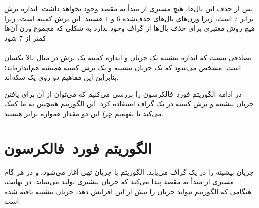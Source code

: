 \begin{center}
\end{center}

پس از حذف این یال‌ها،
هیچ مسیری از مبدأ به مقصد وجود نخواهد داشت.
اندازه برش برابر $7$ است،
زیرا وزن‌های یال‌های حذف‌شده
$6$ و $1$ هستند.
این برش کمینه است، زیرا هیچ روش
معتبری برای حذف یال‌ها از گراف وجود ندارد به شکلی که
مجموع وزن آن‌ها کمتر از $7$ شود.
\\\\
تصادفی نیست که
اندازه بیشینه یک جریان
و اندازه کمینه یک برش
در مثال بالا یکسان است.
مشخص می‌شود که یک جریان بیشینه
و یک برش کمینه
\emph{همیشه} هم‌اندازه‌اند؛
بنابراین این مفاهیم دو روی یک سکه‌اند.

در ادامه الگوریتم فورد–فالکرسون
را بررسی می‌کنیم که می‌توان از آن برای یافتن
جریان بیشینه و برش کمینه در یک گراف استفاده کرد.
این الگوریتم همچنین به ما کمک می‌کند تا بفهمیم
\emph{چرا} این دو مقدار همواره برابر هستند.

\section{الگوریتم فورد–فالکرسون}


 \cite{for56}
جریان بیشینه را در یک گراف می‌یابد.
الگوریتم با جریان تهی آغاز می‌شود،
و در هر گام مسیری از مبدأ
به مقصد پیدا می‌کند که جریان بیشتری تولید می‌نماید.
در نهایت، هنگامی که الگوریتم نتواند جریان را بیش از این
افزایش دهد، جریان بیشینه یافته شده است.

